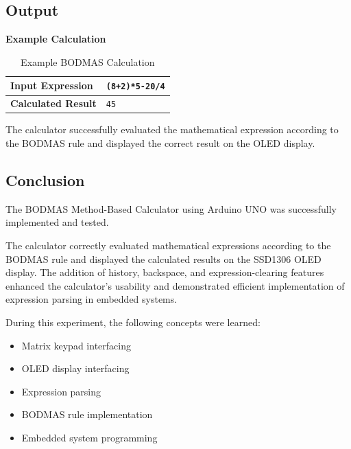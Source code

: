 
\subsection{Output}

\textbf{Example Calculation}

\begin{table}[H]
\centering
\caption{Example BODMAS Calculation}
\label{tab:bodmas_output}

\begin{tabular}{|l|l|}
\hline
\textbf{Input Expression} & \texttt{(8+2)*5-20/4} \\
\hline
\textbf{Calculated Result} & \texttt{45} \\
\hline
\end{tabular}

\end{table}

The calculator successfully evaluated the mathematical expression according to the BODMAS rule and displayed the correct result on the OLED display.


\subsection{Conclusion}

The BODMAS Method-Based Calculator using Arduino UNO was successfully implemented and tested.

The calculator correctly evaluated mathematical expressions according to the BODMAS rule and displayed the calculated results on the SSD1306 OLED display. The addition of history, backspace, and expression-clearing features enhanced the calculator's usability and demonstrated efficient implementation of expression parsing in embedded systems.

During this experiment, the following concepts were learned:

\begin{itemize}

\item Matrix keypad interfacing

\item OLED display interfacing

\item Expression parsing

\item BODMAS rule implementation

\item Embedded system programming

\end{itemize}


